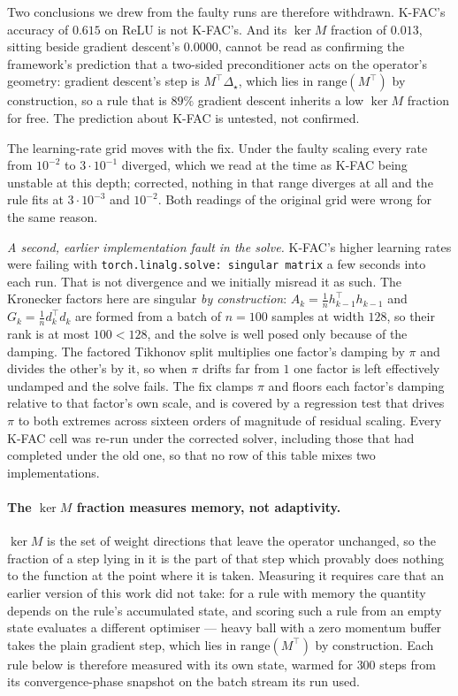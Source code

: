 \documentclass{article} %
\theoremstyle{plain}
\theoremstyle{definition}
\theoremstyle{remark}
\begin{document}
Two conclusions we drew from the faulty runs are therefore withdrawn. K-FAC's accuracy of $0.615$
on ReLU is not K-FAC's. And its $\ker M$ fraction of $0.013$, sitting beside gradient descent's
$0.0000$, cannot be read as confirming the framework's prediction that a two-sided preconditioner
acts on the operator's geometry: gradient descent's step is $M^\top\Delta_\star$, which lies in
$\mathrm{range}(M^\top)$ by construction, so a rule that is $89\%$ gradient descent inherits a low
$\ker M$ fraction for free. The prediction about K-FAC is untested, not confirmed.

The learning-rate grid moves with the fix. Under the faulty scaling every rate from $10^{-2}$ to
$3\cdot10^{-1}$ diverged, which we read at the time as K-FAC being unstable at this depth;
corrected, nothing in that range diverges at all and the rule fits at $3\cdot10^{-3}$ and
$10^{-2}$. Both readings of the original grid were wrong for the same reason.

\emph{A second, earlier implementation fault in the solve.}
K-FAC's higher learning rates were failing with \texttt{torch.linalg.solve: singular matrix} a few
seconds into each run. That is not divergence and we initially misread it as such. The Kronecker
factors here are singular \emph{by construction}: $A_k = \frac{1}{n}h_{k-1}^\top h_{k-1}$ and
$G_k = \frac{1}{n}d_k^\top d_k$ are formed from a batch of $n = 100$ samples at width $128$, so
their rank is at most $100 < 128$, and the solve is well posed only because of the damping. The
factored Tikhonov split multiplies one factor's damping by $\pi$ and divides the other's by it, so
when $\pi$ drifts far from $1$ one factor is left effectively undamped and the solve fails. The fix
clamps $\pi$ and floors each factor's damping relative to that factor's own scale, and is covered
by a regression test that drives $\pi$ to both extremes across sixteen orders of magnitude of
residual scaling. Every K-FAC cell was re-run under the corrected solver, including those that had
completed under the old one, so that no row of this table mixes two implementations.

\paragraph{The $\ker M$ fraction measures memory, not adaptivity.}
$\ker M$ is the set of weight directions that leave the operator unchanged, so the fraction of a
step lying in it is the part of that step which provably does nothing to the function at the point
where it is taken. Measuring it requires care that an earlier version of this work did not take:
for a rule with memory the quantity depends on the rule's accumulated state, and scoring such a
rule from an empty state evaluates a different optimiser --- heavy ball with a zero momentum buffer
takes the plain gradient step, which lies in $\mathrm{range}(M^\top)$ by construction. Each rule
below is therefore measured with its own state, warmed for $300$ steps from its convergence-phase
snapshot on the batch stream its run used.
\end{document}

